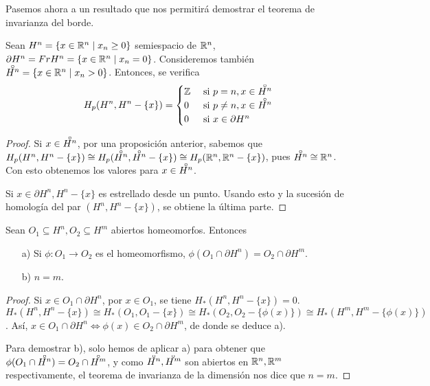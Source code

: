 Pasemos ahora a un resultado que nos permitirá demostrar el teorema de invarianza del borde.

\begin{lemma}
  Sean $H^n = \{x \in \mathbb{R}^n \mid x_n \geq 0 \}$ semiespacio de $\mathbb{R}^n$, $\partial H^n = Fr H^n = \{x \in \mathbb{R}^n \mid x_n = 0\}$.
  Consideremos también $\interior{H^n} = \{x \in \R^n \mid x_n > 0\}$. Entonces, se verifica
  \[H_p(H^n, H^n - \{x\}) =
    \begin{cases} \Z &\text{ si } p = n, x \in \interior{H^n} \\
                  0  &\text{ si } p \neq n, x \in \interior{H^n} \\
                  0  &\text{ si } x \in \partial H^n  \end{cases} \]
\end{lemma}

\begin{proof}
  Si $x \in \interior{H^n}$, por una proposición anterior, sabemos que
  $H_p(H^n, H^n - \{x\}) \cong H_p(\interior{H^n}, \interior{H^n} - \{x\}) \cong H_p(\R^n, \R^n - \{x\})$, pues
  $\interior{H^n} \cong \R^n$. Con esto obtenemos los valores para $x \in \interior{H^n}$.

  Si $x \in \partial H^n, H^n - \{x\}$ es estrellado desde un punto. Usando esto y la sucesión de homología del par $(H^n, H^n - \{x\})$,
  se obtiene la última parte.
\end{proof}

\begin{corollary}
  Sean $O_1 \subseteq H^n, O_2 \subseteq H^m$ abiertos homeomorfos. Entonces
  \begin{itemize}
    \item [a)] Si $\phi \colon O_1 \to O_2$ es el homeomorfismo, $\phi(O_1 \cap \partial H^n) = O_2 \cap \partial H^m$.
    \item [b)] $n = m$.
  \end{itemize}
\end{corollary}

\begin{proof}
  Si $x \in O_1 \cap \partial H^n$, por $x \in O_1$, se tiene $H_*(H^n, H^n - \{x\}) = 0$. \\
  $H_*(H^n, H^n - \{x\}) \cong H_*(O_1, O_1 - \{x\}) \cong H_*(O_2, O_2 - \{\phi(x)\}) \cong H_*(H^m, H^m - \{\phi(x)\})$.
  Así, $x \in O_1 \cap \partial H^n \iff \phi(x) \in O_2 \cap \partial H^m$, de donde se deduce a).

  Para demostrar b), solo hemos de aplicar a) para obtener que $\phi(O_1 \cap \interior{H^n}) = O_2 \cap \interior{H^m}$, y como
  $\interior{H^n}, \interior{H^m}$ son abiertos en $\mathbb{R}^n, \mathbb{R}^m$ respectivamente, el teorema de invarianza de la dimensión
  nos dice que $n = m$.
\end{proof}


